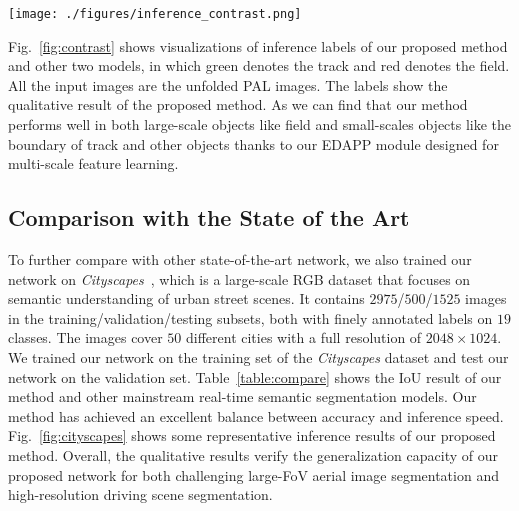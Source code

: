 \documentclass[letterpaper, 10 pt, conference]{ieeeconf}
\begin{document}
\begin{figure*}
    \centering
    \texttt{[image: ./figures/inference\_contrast.png]}
    \caption{Qualitative semantic segmentation results. From top to bottom row: RGB input image, ERF-PSPNet, SwiftNet, our method, and ground truth.}
    \label{fig:contrast}
\end{figure*}

Fig.~\ref{fig:contrast} shows visualizations of inference labels of our proposed method and other two models, in which green denotes the track and red denotes the field. All the input images are the unfolded PAL images.
The labels show the qualitative result of the proposed method.
As we can find that our method performs well in both large-scale objects like field and small-scales objects like the boundary of track and other objects thanks to our EDAPP module designed for multi-scale feature learning.

\subsection{Comparison with the State of the Art}

To further compare with other state-of-the-art network, we also trained our network on \emph{Cityscapes}~\cite{Cordts2016Cityscapes}, which is a large-scale RGB dataset that focuses on semantic understanding of urban street scenes.
It contains $2975$/$500$/$1525$ images in the training/validation/testing subsets, both with finely annotated labels on $19$ classes.
The images cover $50$ different cities with a full resolution of $2048\times1024$.
We trained our network on the training set of the \emph{Cityscapes} dataset and test our network on the validation set. Table~\ref{table:compare} shows the IoU result of our method and other mainstream real-time semantic segmentation models.
Our method has achieved an excellent balance between accuracy and inference speed. Fig.~\ref{fig:cityscapes} shows some representative inference results of our proposed method. Overall, the qualitative results verify the generalization capacity of our proposed network for both challenging large-FoV aerial image segmentation and high-resolution driving scene segmentation. 
\end{document}
